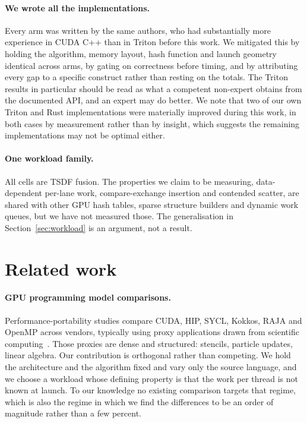 \documentclass[11pt]{article}
\begin{document}
\paragraph{We wrote all the implementations.} Every arm was written by the same
authors, who had substantially more experience in CUDA C++ than in Triton before
this work. We mitigated this by holding the algorithm, memory layout, hash
function and launch geometry identical across arms, by gating on correctness
before timing, and by attributing every gap to a specific construct rather than
resting on the totals. The Triton results in particular should be read as what a
competent non-expert obtains from the documented API, and an expert may do
better. We note that two of our own Triton and Rust implementations were
materially improved during this work, in both cases by measurement rather than by
insight, which suggests the remaining implementations may not be optimal either.

\paragraph{One workload family.} All cells are TSDF fusion. The properties we
claim to be measuring, data-dependent per-lane work, compare-exchange insertion
and contended scatter, are shared with other GPU hash tables, sparse structure
builders and dynamic work queues, but we have not measured those. The
generalisation in Section~\ref{sec:workload} is an argument, not a result.

\section{Related work}
\label{sec:related}

\paragraph{GPU programming model comparisons.} Performance-portability studies
compare CUDA, HIP, SYCL, Kokkos, RAJA and OpenMP across vendors, typically using
proxy applications drawn from scientific computing~\cite{davis2024portability}.
Those proxies are dense and structured: stencils, particle updates, linear
algebra. Our contribution is orthogonal rather than competing. We hold the
architecture and the algorithm fixed and vary only the source language, and we
choose a workload whose defining property is that the work per thread is not
known at launch. To our knowledge no existing comparison targets that regime,
which is also the regime in which we find the differences to be an order of
magnitude rather than a few percent.
\end{document}
